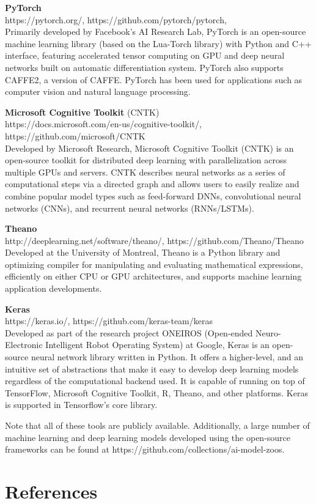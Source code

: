 \noindent\textbf{PyTorch} \\https://pytorch.org/, https://github.com/pytorch/pytorch, \\Primarily developed by Facebook's AI Research Lab, PyTorch is an open-source machine learning library (based on the Lua-Torch library) with Python and C++ interface, featuring accelerated tensor computing on GPU and deep neural networks built on automatic differentiation system. PyTorch also supports CAFFE2, a version of CAFFE. PyTorch has been used for applications such as computer vision and natural language processing. 
\newline

\noindent\textbf{Microsoft Cognitive Toolkit} (CNTK) \\https://docs.microsoft.com/en-us/cognitive-toolkit/, https://github.com/microsoft/CNTK \\Developed by Microsoft Research, Microsoft Cognitive Toolkit (CNTK) is an open-source toolkit for distributed deep learning with parallelization across multiple GPUs and servers. CNTK describes neural networks as a series of computational steps via a directed graph and allows users to easily realize and combine popular model types such as feed-forward DNNs, convolutional neural networks (CNNs), and recurrent neural networks (RNNs/LSTMs).
\newline

\noindent\textbf{Theano} \\http://deeplearning.net/software/theano/, https://github.com/Theano/Theano \\Developed at the University of Montreal, Theano is a Python library and optimizing compiler for manipulating and evaluating mathematical expressions, efficiently on either CPU or GPU architectures, and supports machine learning application developments. 
\newline

\noindent\textbf{Keras} \\https://keras.io/, https://github.com/keras-team/keras \\Developed as part of the research project ONEIROS (Open-ended Neuro-Electronic Intelligent Robot Operating System) at Google, Keras is an open-source neural network library written in Python. It offers a higher-level, and an intuitive set of abstractions that make it easy to develop deep learning models regardless of the computational backend used. It is capable of running on top of TensorFlow, Microsoft Cognitive Toolkit, R, Theano, and other platforms. Keras is supported in Tensorflow's core library. 
\newline

Note that all of these tools are publicly available. Additionally, a large number of machine learning and deep learning models developed using the open-source frameworks can be found at https://github.com/collections/ai-model-zoos.

\section{References}
